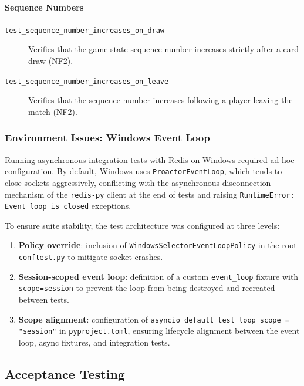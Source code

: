 \documentclass{scrartcl}
\begin{document}
\paragraph{Sequence Numbers}
\begin{description}
  \item[\texttt{test\_sequence\_number\_increases\_on\_draw}] Verifies that
  the game state sequence number increases strictly after a card draw (NF2).

  \item[\texttt{test\_sequence\_number\_increases\_on\_leave}] Verifies that
  the sequence number increases following a player leaving the match (NF2).
\end{description}

\subsubsection*{Environment Issues: Windows Event Loop}

Running asynchronous integration tests with Redis on Windows required
ad-hoc configuration. By default, Windows uses \texttt{ProactorEventLoop},
which tends to close sockets aggressively, conflicting with the asynchronous
disconnection mechanism of the \texttt{redis-py} client at the end of tests
and raising \texttt{RuntimeError: Event loop is closed} exceptions.

To ensure suite stability, the test architecture was configured at three levels:

\begin{enumerate}
  \item \textbf{Policy override}: inclusion of \texttt{WindowsSelectorEventLoopPolicy}
  in the root \texttt{conftest.py} to mitigate socket crashes.

  \item \textbf{Session-scoped event loop}: definition of a custom
  \texttt{event\_loop} fixture with \texttt{scope=session} to prevent the
  loop from being destroyed and recreated between tests.

  \item \textbf{Scope alignment}: configuration of
  \texttt{asyncio\_default\_test\_loop\_scope = "session"} in
  \texttt{pyproject.toml}, ensuring lifecycle alignment between the event
  loop, async fixtures, and integration tests.
\end{enumerate}

\subsection{Acceptance Testing}\label{acceptance-test}
\end{document}
